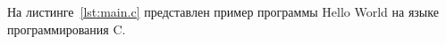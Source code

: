 \documentclass{bmstu}
\begin{document}
На листинге~\ref{lst:main.c} представлен пример программы Hello World на языке программирования C.

\end{document}
